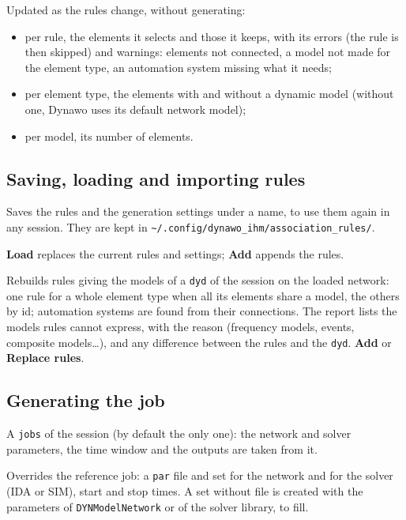 \documentclass[a4paper,11pt]{article}
\newcommand{\code}[1]{\texttt{\small #1}}
\newcommand{\ftype}[1]{\texttt{\small\color{rteblu}#1}}
\begin{document}
Updated as the rules change, without generating:

\begin{itemize}[leftmargin=2em]
  \item per rule, the elements it selects and those it keeps, with its errors
    (the rule is then skipped) and warnings: elements not connected, a model
    not made for the element type, an automation system missing what it needs;
  \item per element type, the elements with and without a dynamic model
    (without one, Dynawo uses its default network model);
  \item per model, its number of elements.
\end{itemize}

\subsection{Saving, loading and importing rules}

\begin{description}[leftmargin=2em]
  \item[\textbf{Save rules\ldots}] Saves the rules and the generation settings
    under a name, to use them again in any session. They are kept in
    \code{\textasciitilde/.config/dynawo\_ihm/association\_rules/}.
  \item[\textbf{Load rules\ldots}] \textbf{Load} replaces the current rules
    and settings; \textbf{Add} appends the rules.
  \item[\textbf{Import from a .dyd\ldots}] Rebuilds rules giving the models of
    a \ftype{dyd} of the session on the loaded network: one rule for a whole
    element type when all its elements share a model, the others by id;
    automation systems are found from their connections. The report lists the
    models rules cannot express, with the reason (frequency models, events,
    composite models\ldots), and any difference between the rules and the
    \ftype{dyd}. \textbf{Add} or \textbf{Replace rules}.
\end{description}

\subsection{Generating the job}

\begin{description}[leftmargin=2em]
  \item[\textbf{Reference job}] A \ftype{jobs} of the session (by default the
    only one): the network and solver parameters, the time window and the
    outputs are taken from it.
  \item[\textbf{Network and solver parameters, time window}] Overrides the
    reference job: a \ftype{par} file and set for the network and for the
    solver (IDA or SIM), start and stop times. A set without file is created
    with the parameters of \code{DYNModelNetwork} or of the solver library,
    to fill.
\end{description}
\end{document}
